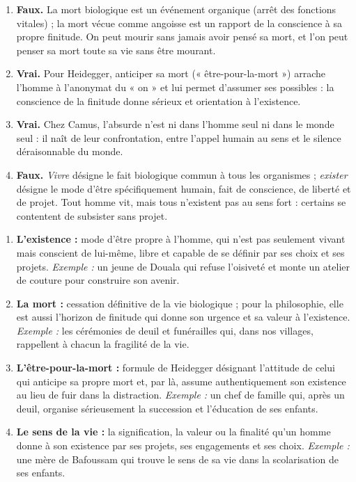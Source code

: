 \documentclass[11pt]{article}
\begin{document}
\begin{corrige}
\begin{enumerate}
\item \textbf{Faux.} La mort biologique est un événement organique (arrêt des fonctions vitales) ; la mort vécue comme angoisse est un rapport de la conscience à sa propre finitude. On peut mourir sans jamais avoir pensé sa mort, et l'on peut penser sa mort toute sa vie sans être mourant.
\item \textbf{Vrai.} Pour Heidegger, anticiper sa mort (« être-pour-la-mort ») arrache l'homme à l'anonymat du « on » et lui permet d'assumer ses possibles : la conscience de la finitude donne sérieux et orientation à l'existence.
\item \textbf{Vrai.} Chez Camus, l'absurde n'est ni dans l'homme seul ni dans le monde seul : il naît de leur confrontation, entre l'appel humain au sens et le silence déraisonnable du monde.
\item \textbf{Faux.} \emph{Vivre} désigne le fait biologique commun à tous les organismes ; \emph{exister} désigne le mode d'être spécifiquement humain, fait de conscience, de liberté et de projet. Tout homme vit, mais tous n'existent pas au sens fort : certains se contentent de subsister sans projet.
\end{enumerate}
\end{corrige}

\begin{corrige}
\begin{enumerate}
\item \textbf{L'existence :} mode d'être propre à l'homme, qui n'est pas seulement vivant mais conscient de lui-même, libre et capable de se définir par ses choix et ses projets. \emph{Exemple :} un jeune de Douala qui refuse l'oisiveté et monte un atelier de couture pour construire son avenir.
\item \textbf{La mort :} cessation définitive de la vie biologique ; pour la philosophie, elle est aussi l'horizon de finitude qui donne son urgence et sa valeur à l'existence. \emph{Exemple :} les cérémonies de deuil et funérailles qui, dans nos villages, rappellent à chacun la fragilité de la vie.
\item \textbf{L'être-pour-la-mort :} formule de Heidegger désignant l'attitude de celui qui anticipe sa propre mort et, par là, assume authentiquement son existence au lieu de fuir dans la distraction. \emph{Exemple :} un chef de famille qui, après un deuil, organise sérieusement la succession et l'éducation de ses enfants.
\item \textbf{Le sens de la vie :} la signification, la valeur ou la finalité qu'un homme donne à son existence par ses projets, ses engagements et ses choix. \emph{Exemple :} une mère de Bafoussam qui trouve le sens de sa vie dans la scolarisation de ses enfants.
\end{enumerate}
\end{corrige}
\end{document}
